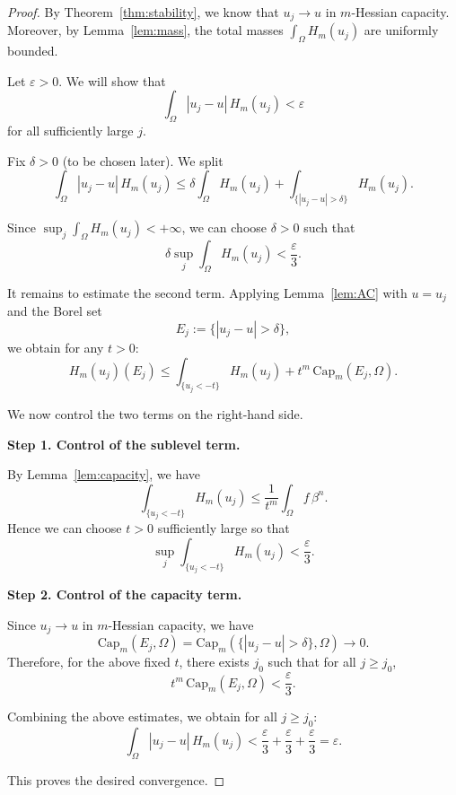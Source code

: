 \documentclass[10pt,a4paper]{amsart}
\begin{document}
\begin{proof}
	By Theorem~\ref{thm:stability}, we know that $u_j \to u$ in $m$-Hessian capacity. 
	Moreover, by Lemma~\ref{lem:mass}, the total masses $\int_\Omega H_m(u_j)$ are uniformly bounded.
	
	Let $\varepsilon>0$. We will show that
	\[
	\int_\Omega |u_j-u|\,H_m(u_j) < \varepsilon
	\]
	for all sufficiently large $j$.
	
	Fix $\delta>0$ (to be chosen later). We split
	\[
	\int_\Omega |u_j-u|\,H_m(u_j)
	\le 
	\delta \int_\Omega H_m(u_j)
	+
	\int_{\{|u_j-u|>\delta\}} H_m(u_j).
	\]
	
	Since $\sup_j \int_\Omega H_m(u_j) < +\infty$, we can choose $\delta>0$ such that
	\[
	\delta \sup_j \int_\Omega H_m(u_j) < \frac{\varepsilon}{3}.
	\]
	
	It remains to estimate the second term. 
	Applying Lemma~\ref{lem:AC} with $u = u_j$ and the Borel set 
	\[
	E_j := \{|u_j-u|>\delta\},
	\]
	we obtain for any $t>0$:
	\[
	H_m(u_j)(E_j)
	\le 
	\int_{\{u_j<-t\}} H_m(u_j)
	+
	t^m \,\mathrm{Cap}_m(E_j,\Omega).
	\]
	
	We now control the two terms on the right-hand side.
	
	\medskip
	\noindent
	\textbf{Step 1. Control of the sublevel term.}
	
	By Lemma~\ref{lem:capacity}, we have
	\[
	\int_{\{u_j<-t\}} H_m(u_j)
	\le 
	\frac{1}{t^m} \int_\Omega f\,\beta^n.
	\]
	Hence we can choose $t>0$ sufficiently large so that
	\[
	\sup_j \int_{\{u_j<-t\}} H_m(u_j) < \frac{\varepsilon}{3}.
	\]
	
	\medskip
	\noindent
	\textbf{Step 2. Control of the capacity term.}
	
	Since $u_j \to u$ in $m$-Hessian capacity, we have
	\[
	\mathrm{Cap}_m(E_j,\Omega)
	=
	\mathrm{Cap}_m(\{|u_j-u|>\delta\},\Omega)
	\longrightarrow 0.
	\]
	Therefore, for the above fixed $t$, there exists $j_0$ such that for all $j \ge j_0$,
	\[
	t^m \,\mathrm{Cap}_m(E_j,\Omega)
	<
	\frac{\varepsilon}{3}.
	\]
	
	\medskip
	Combining the above estimates, we obtain for all $j \ge j_0$:
	\[
	\int_\Omega |u_j-u|\,H_m(u_j)
	<
	\frac{\varepsilon}{3}
	+
	\frac{\varepsilon}{3}
	+
	\frac{\varepsilon}{3}
	=
	\varepsilon.
	\]
	
	This proves the desired convergence.
\end{proof}
\end{document}
